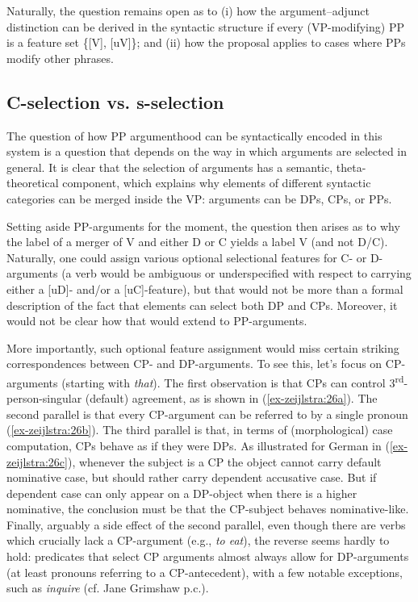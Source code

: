 \documentclass[output=paper
,modfonts
,nonflat]{langsci/langscibook}
\begin{document}
Naturally, the question remains open as to (i) how the argument–adjunct distinction can be derived in the syntactic structure if every (VP-modifying) PP is a feature set \{[V], [uV]\}; and (ii) how the proposal applies to cases where PPs modify other phrases.

\subsection{C-selection vs. s-selection}
The question of how PP argumenthood can be syntactically encoded in this system is a question that depends on the way in which arguments are selected in general. It is clear that the selection of arguments has a semantic, theta-theoretical component, which explains why elements of different syntactic categories can be merged inside the VP: arguments can be DPs, CPs, or PPs.

Setting aside PP-arguments for the moment, the question then arises as to why the label of a merger of V and either D or C yields a label V (and not D\slash C). Naturally, one could assign various optional selectional features for C- or D-ar\-gu\-ments (a verb would be ambiguous or underspecified with respect to carrying either a [uD]- and/or a [uC]-feature), but that would not be more than a formal description of the fact that elements can select both DP and CPs. Moreover, it would not be clear how that would extend to PP-arguments.

More importantly, such optional feature assignment would miss certain striking correspondences between CP- and DP-arguments. To see this, let’s focus on CP-arguments (starting with \textit{that}). The first observation is that CPs can control 3\textsuperscript{rd}-person-singular (default) agreement, as is shown in (\ref{ex-zeijlstra:26a}). The second parallel is that every CP-argument can be referred to by a single pronoun (\ref{ex-zeijlstra:26b}). The third parallel is that, in terms of (morphological) case computation, CPs behave as if they were DPs. As illustrated for German in (\ref{ex-zeijlstra:26c}), whenever the subject is a CP the object cannot carry default nominative case, but should rather carry dependent accusative case. But if dependent case can only appear on a DP-object when there is a higher nominative, the conclusion must be that the CP-subject behaves nominative-like. Finally, arguably a side effect of the second parallel, even though there are verbs which crucially lack a CP-argument (e.g., \textit{to eat}), the reverse seems hardly to hold: predicates that select CP arguments almost always allow for DP-arguments (at least pronouns referring to a CP-antecedent), with a few notable exceptions, such as \textit{inquire} (cf. Jane Grimshaw p.c.).
\end{document}
